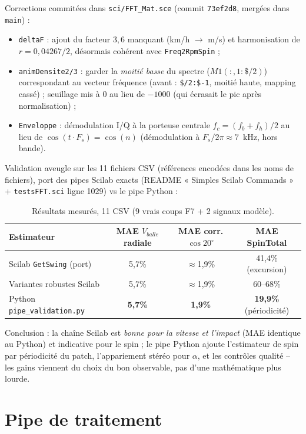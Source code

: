 \documentclass[10pt,a4paper]{report}
\begin{document}
Corrections commitées dans \texttt{sci/FFT\_Mat.sce} (commit \texttt{73ef2d8}, mergées dans \texttt{main}) :
\begin{itemize}
  \item \texttt{deltaF} : ajout du facteur $3{,}6$ manquant (km/h $\to$ m/s) et harmonisation de $r=0{,}04267/2$, désormais cohérent avec \texttt{Freq2RpmSpin} ;
  \item \texttt{animDensite2/3} : garder la \emph{moitié basse} du spectre ($M1(:,1:\$/2)$) correspondant au vecteur fréquence (avant : \texttt{\$/2:\$-1}, moitié haute, mapping cassé) ; seuillage mis à 0 au lieu de $-1000$ (qui écrasait le pic après normalisation) ;
  \item \texttt{Enveloppe} : démodulation I/Q à la porteuse centrale $f_c=(f_b+f_h)/2$ au lieu de $\cos(t\cdot F_s)=\cos(n)$ (démodulation à $F_s/2\pi\approx 7$~kHz, hors bande).
\end{itemize}

Validation aveugle sur les 11 fichiers CSV (références encodées dans les noms de fichiers), port des pipes Scilab exacts (README « Simples Scilab Commands » + \texttt{testsFFT.sci} ligne 1029) vs le pipe Python :

\begin{table}[H]\centering
\caption{Résultats mesurés, 11 CSV (9 vrais coups F7 + 2 signaux modèle).}
\label{tab:scilabvspython}
\small
\begin{tabular}{|l|c|c|c|}
\hline
Estimateur & MAE $V_{balle}$ radiale & MAE corr. $\cos20^\circ$ & MAE SpinTotal \\ \hline
Scilab \texttt{GetSwing} (port) & 5,7\% & $\approx$1,9\% & 41,4\% (excursion) \\
Variantes robustes Scilab & 5,7\% & $\approx$1,9\% & 60--68\% \\
Python \texttt{pipe\_validation.py} & \textbf{5,7\%} & \textbf{1,9\%} & \textbf{19,9\%} (périodicité) \\ \hline
\end{tabular}
\end{table}

Conclusion : la chaîne Scilab est \emph{bonne pour la vitesse et l'impact} (MAE identique au Python) et indicative pour le spin ; le pipe Python ajoute l'estimateur de spin par périodicité du patch, l'appariement stéréo pour $\alpha$, et les contrôles qualité -- les gains viennent du choix du bon observable, pas d'une mathématique plus lourde.

\section{Pipe de traitement}
\end{document}
